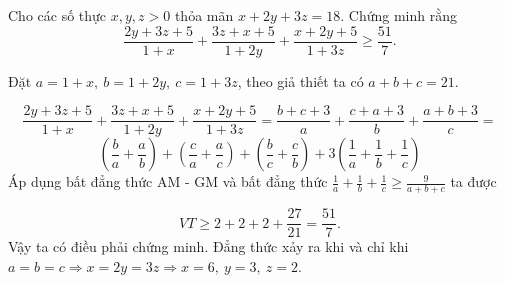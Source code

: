 \begin{problem}
	Cho các số thực $x, y, z > 0$ thỏa mãn $x + 2y + 3z = 18$. Chứng minh rằng
	\[
		\frac{2y + 3z + 5}{1 + x} + \frac{3z + x + 5}{1 + 2y} + \frac{x + 2y + 5}{1 + 3z}
		\ge \frac{51}{7}.
	\]

	\solution

	Đặt $a = 1 + x,\ b = 1 + 2y,\ c = 1 + 3z$, theo giả thiết ta có $a + b + c = 21$.

	$$
		\frac{2y + 3z + 5}{1 + x} + \frac{3z + x + 5}{1 + 2y} + \frac{x + 2y + 5}{1 + 3z} = 
		\frac{b + c + 3}{a} + \frac{c + a + 3}{b} + \frac{a + b + 3}{c} = 
	$$
	\[
		\left(\frac{b}{a} + \frac{a}{b}\right) + \left(\frac{c}{a} + \frac{a}{c}\right) + \left(\frac{b}{c} + \frac{c}{b}\right) + 
		3\left(\frac{1}{a} + \frac{1}{b} + \frac{1}{c}\right)  
	\]
	Áp dụng bất đẳng thức AM - GM và bất đẳng thức $\displaystyle \frac{1}{a} + \frac{1}{b} + \frac{1}{c} \ge \frac{9}{a + b + c}$ ta được

	\[
		VT \ge 2 + 2 + 2 + \frac{27}{21} = \frac{51}{7}.		
	\]
	Vậy ta có điều phải chứng minh. Đẳng thức xảy ra khi và chỉ khi $a = b = c \Rightarrow x = 2y = 3z \Rightarrow x = 6,\ y = 3,\ z = 2$.
\end{problem}